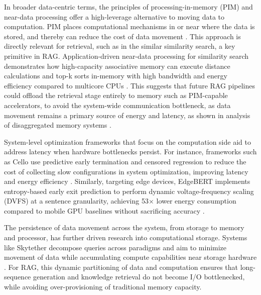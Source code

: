 \documentclass[11pt]{article}
\begin{document}
In broader data-centric terms, the principles of processing-in-memory (PIM) and near-data processing offer a high-leverage alternative to moving data to computation. PIM places computational mechanisms in or near where the data is stored, and thereby can reduce the cost of data movement \cite{ref228,ref230}. This approach is directly relevant for retrieval, such as in the similar similarity search, a key primitive in RAG. Application-driven near-data processing for similarity search demonstrates how high-capacity associative memory can execute distance calculations and top-k sorts in-memory with high bandwidth and energy efficiency compared to multicore CPUs \cite{ref232}. This suggests that future RAG pipelines could offload the retrieval stage entirely to memory such as PIM-capable accelerators, to avoid the system-wide communication bottleneck, as data movement remains a primary source of energy and latency, as shown in analysis of disaggregated memory systems \cite{ref233,ref229}.

System-level optimization frameworks that focus on the computation side aid to address latency when hardware bottlenecks persist. For instance, frameworks such as Cello use predictive early termination and censored regression to reduce the cost of collecting slow configurations in system optimization, improving latency and energy efficiency \cite{ref234}. Similarly, targeting edge devices, EdgeBERT implements entropy-based early exit prediction to perform dynamic voltage-frequency scaling (DVFS) at a sentence granularity, achieving 53× lower energy consumption compared to mobile GPU baselines without sacrificing accuracy \cite{ref235}.

The persistence of data movement across the system, from storage to memory and processor, has further driven research into computational storage. Systems like Skytether decompose queries across paradigms and aim to minimize movement of data while accumulating compute capabilities near storage hardware \cite{ref236}. For RAG, this dynamic partitioning of data and computation ensures that long-sequence generation and knowledge retrieval do not become I/O bottlenecked, while avoiding over-provisioning of traditional memory capacity.
\end{document}
